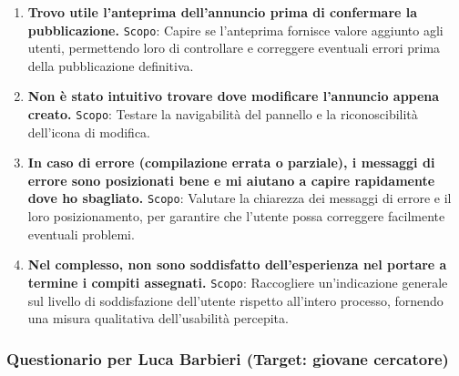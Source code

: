 \begin{enumerate}
	\item \textbf{Trovo utile l’anteprima dell’annuncio prima di confermare la pubblicazione.}
	\newline
	\texttt{Scopo}: Capire se l’anteprima fornisce valore aggiunto agli utenti, permettendo loro di controllare e correggere eventuali errori prima della pubblicazione definitiva.
	
	\item \textbf{Non è stato intuitivo trovare dove modificare l’annuncio appena creato.}
	\newline
	\texttt{Scopo}: Testare la navigabilità del pannello e la riconoscibilità dell’icona di modifica.
	
	\item \textbf{In caso di errore (compilazione errata o parziale), i messaggi di errore sono posizionati bene e mi aiutano a capire rapidamente dove ho sbagliato.}
	\newline
	\texttt{Scopo}: Valutare la chiarezza dei messaggi di errore e il loro posizionamento, per garantire che l’utente possa correggere facilmente eventuali problemi.
	
	\item \textbf{Nel complesso, non sono soddisfatto dell’esperienza nel portare a termine i compiti assegnati.}
	\newline
	\texttt{Scopo}: Raccogliere un’indicazione generale sul livello di soddisfazione dell’utente rispetto all’intero processo, fornendo una misura qualitativa dell’usabilità percepita.
	
\end{enumerate}

\vspace{0.5cm} %
\subsubsection*{Questionario per Luca Barbieri (Target: giovane cercatore)}
\vspace{0.5cm} %

